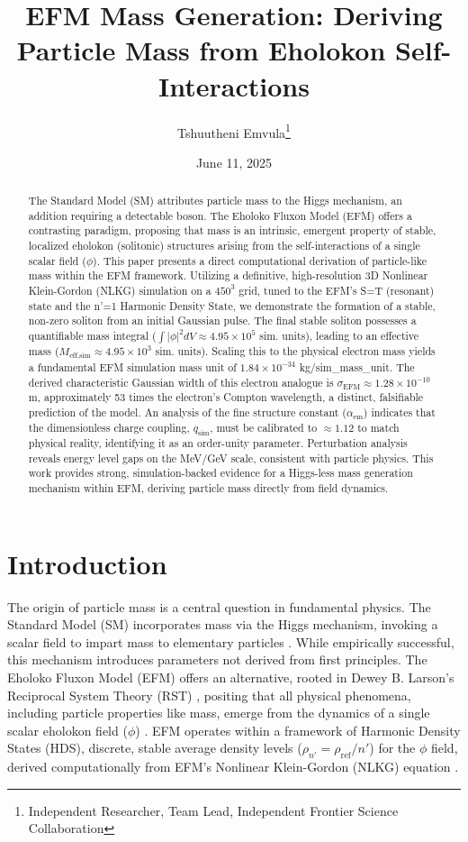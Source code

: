 \documentclass[11pt]{article}
\title{EFM Mass Generation: Deriving Particle Mass from Eholokon Self-Interactions}
\author{Tshuutheni Emvula\thanks{Independent Researcher, Team Lead, Independent Frontier Science Collaboration}}
\date{June 11, 2025} %
\begin{document}
\maketitle

\begin{abstract}
The Standard Model (SM) attributes particle mass to the Higgs mechanism, an addition requiring a detectable boson. The Eholoko Fluxon Model (EFM) offers a contrasting paradigm, proposing that mass is an intrinsic, emergent property of stable, localized eholokon (solitonic) structures arising from the self-interactions of a single scalar field (\(\phi\)). This paper presents a direct computational derivation of particle-like mass within the EFM framework. Utilizing a definitive, high-resolution 3D Nonlinear Klein-Gordon (NLKG) simulation on a \(450^3\) grid, tuned to the EFM's S=T (resonant) state and the n'=1 Harmonic Density State, we demonstrate the formation of a stable, non-zero soliton from an initial Gaussian pulse. The final stable soliton possesses a quantifiable mass integral (\(\int|\phi|^2 dV \approx 4.95 \times 10^5\) sim. units), leading to an effective mass (\(M_{\text{eff,sim}} \approx 4.95 \times 10^3\) sim. units). Scaling this to the physical electron mass yields a fundamental EFM simulation mass unit of \(1.84 \times 10^{-34}\) kg/sim\_mass\_unit. The derived characteristic Gaussian width of this electron analogue is \( \sigma_{\text{EFM}} \approx 1.28 \times 10^{-10} \) m, approximately 53 times the electron's Compton wavelength, a distinct, falsifiable prediction of the model. An analysis of the fine structure constant (\(\alpha_{\text{em}}\)) indicates that the dimensionless charge coupling, \(q_{\text{sim}}\), must be calibrated to \( \approx 1.12 \) to match physical reality, identifying it as an order-unity parameter. Perturbation analysis reveals energy level gaps on the MeV/GeV scale, consistent with particle physics. This work provides strong, simulation-backed evidence for a Higgs-less mass generation mechanism within EFM, deriving particle mass directly from field dynamics.
\end{abstract}

\section{Introduction}
The origin of particle mass is a central question in fundamental physics. The Standard Model (SM) incorporates mass via the Higgs mechanism, invoking a scalar field to impart mass to elementary particles \citep{SMReviewPlaceholder}. While empirically successful, this mechanism introduces parameters not derived from first principles. The Eholoko Fluxon Model (EFM) offers an alternative, rooted in Dewey B. Larson's Reciprocal System Theory (RST) \citep{larson1959}, positing that all physical phenomena, including particle properties like mass, emerge from the dynamics of a single scalar eholokon field (\(\phi\)) \citep{emvula2025compendium_intro}. EFM operates within a framework of Harmonic Density States (HDS), discrete, stable average density levels (\(\rho_{n'} = \rho_{\text{ref}}/n'\)) for the \(\phi\) field, derived computationally from EFM's Nonlinear Klein-Gordon (NLKG) equation \citep{emvula2025efm_hds_validated}.
\end{document}
